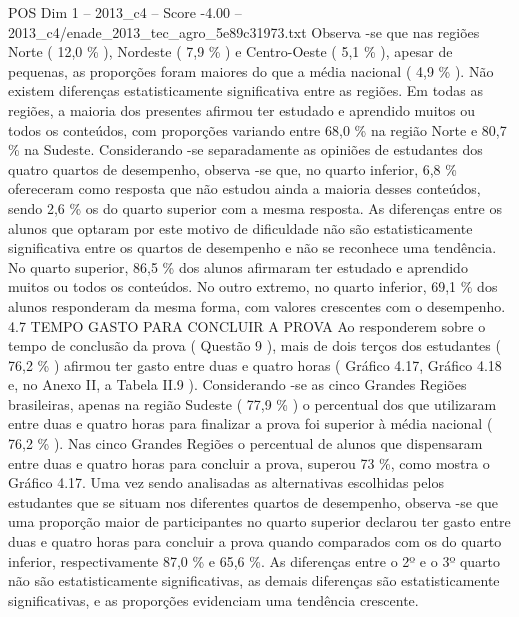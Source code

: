 \begin{textsample}{POS Dim 1 – 2013\_c4 – Score -4.00 – 2013\_c4/enade\_2013\_tec\_agro\_5e89c31973.txt}
Observa -se que nas regiões Norte ( 12,0 \% ), Nordeste ( 7,9 \% ) e Centro-Oeste ( 5,1 \% ), apesar de pequenas, as proporções foram maiores do que a média nacional ( 4,9 \% ).
Não existem diferenças estatisticamente significativa entre as regiões.
Em todas as regiões, a maioria dos presentes afirmou ter estudado e aprendido muitos ou todos os conteúdos, com proporções variando entre 68,0 \% na região Norte e 80,7 \% na Sudeste.
Considerando -se separadamente as opiniões de estudantes dos quatro quartos de desempenho, observa -se que, no quarto inferior, 6,8 \% ofereceram como resposta que não estudou ainda a maioria desses conteúdos, sendo 2,6 \% os do quarto superior com a mesma resposta.
As diferenças entre os alunos que optaram por este motivo de dificuldade não são estatisticamente significativa entre os quartos de desempenho e não se reconhece uma tendência.
No quarto superior, 86,5 \% dos alunos afirmaram ter estudado e aprendido muitos ou todos os conteúdos.
No outro extremo, no quarto inferior, 69,1 \% dos alunos responderam da mesma forma, com valores crescentes com o desempenho. 4.7 TEMPO GASTO PARA CONCLUIR A PROVA Ao responderem sobre o tempo de conclusão da prova ( Questão 9 ), mais de dois terços dos estudantes ( 76,2 \% ) afirmou ter gasto entre duas e quatro horas ( Gráfico 4.17, Gráfico 4.18 e, no Anexo II, a Tabela II.9 ).
Considerando -se as cinco Grandes Regiões brasileiras, apenas na região Sudeste ( 77,9 \% ) o percentual dos que utilizaram entre duas e quatro horas para finalizar a prova foi superior à média nacional ( 76,2 \% ).
Nas cinco Grandes Regiões o percentual de alunos que dispensaram entre duas e quatro horas para concluir a prova, superou 73 \%, como mostra o Gráfico 4.17.
Uma vez sendo analisadas as alternativas escolhidas pelos estudantes que se situam nos diferentes quartos de desempenho, observa -se que uma proporção maior de participantes no quarto superior declarou ter gasto entre duas e quatro horas para concluir a prova quando comparados com os do quarto inferior, respectivamente 87,0 \% e 65,6 \%.
As diferenças entre o 2º e o 3º quarto não são estatisticamente significativas, as demais diferenças são estatisticamente significativas, e as proporções evidenciam uma tendência crescente.

\end{textsample}
